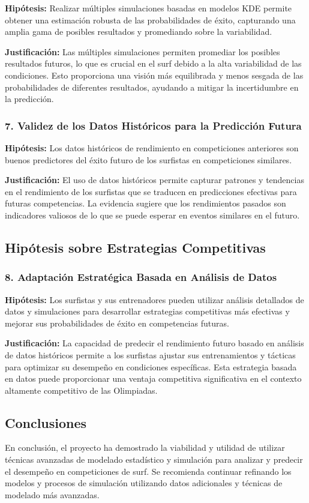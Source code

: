 \documentclass[12pt]{article}
\begin{document}
\textbf{Hipótesis:} Realizar múltiples simulaciones basadas en modelos KDE permite obtener una estimación robusta de las probabilidades de éxito, capturando una amplia gama de posibles resultados y promediando sobre la variabilidad.

\textbf{Justificación:} Las múltiples simulaciones permiten promediar los posibles resultados futuros, lo que es crucial en el surf debido a la alta variabilidad de las condiciones. Esto proporciona una visión más equilibrada y menos sesgada de las probabilidades de diferentes resultados, ayudando a mitigar la incertidumbre en la predicción.

\subsubsection*{7. Validez de los Datos Históricos para la Predicción Futura}

\textbf{Hipótesis:} Los datos históricos de rendimiento en competiciones anteriores son buenos predictores del éxito futuro de los surfistas en competiciones similares.

\textbf{Justificación:} El uso de datos históricos permite capturar patrones y tendencias en el rendimiento de los surfistas que se traducen en predicciones efectivas para futuras competencias. La evidencia sugiere que los rendimientos pasados son indicadores valiosos de lo que se puede esperar en eventos similares en el futuro.

\subsection*{Hipótesis sobre Estrategias Competitivas}

\subsubsection*{8. Adaptación Estratégica Basada en Análisis de Datos}

\textbf{Hipótesis:} Los surfistas y sus entrenadores pueden utilizar análisis detallados de datos y simulaciones para desarrollar estrategias competitivas más efectivas y mejorar sus probabilidades de éxito en competencias futuras.

\textbf{Justificación:} La capacidad de predecir el rendimiento futuro basado en análisis de datos históricos permite a los surfistas ajustar sus entrenamientos y tácticas para optimizar su desempeño en condiciones específicas. Esta estrategia basada en datos puede proporcionar una ventaja competitiva significativa en el contexto altamente competitivo de las Olimpiadas.

\subsection*{Conclusiones}

En conclusión, el proyecto ha demostrado la viabilidad y utilidad de utilizar técnicas avanzadas de modelado estadístico y simulación para analizar y predecir el desempeño en competiciones de surf. Se recomienda continuar refinando los modelos y procesos de simulación utilizando datos adicionales y técnicas de modelado más avanzadas.
\end{document}

